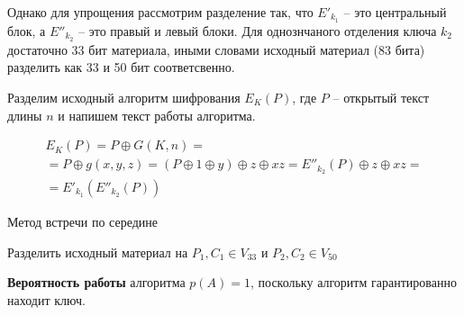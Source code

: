 \documentclass[a4paper,12pt]{article}
\theoremstyle{definition}
\begin{document}
	Однако для упрощения рассмотрим разделение так, что $E'_{k_1}$ -- это центральный блок, а $E''_{k_2}$ -- это правый и левый блоки. Для однознчаного отделения ключа $k_2$ достаточно $33$ бит материала, иными словами исходный материал (83 бита) разделить как 33 и 50 бит соответсвенно.
	
	Разделим исходный алгоритм шифрования $E_K(P)$, где $P$ -- открытый текст длины $n$ и напишем текст работы алгоритма.

	\begin{multline*}	
	E_K(P) = P \oplus G(K, n) = \\ = P \oplus g(x,y,z) = (P \oplus 1 \oplus y) \oplus z \oplus x z = E''_{k_2}(P) \oplus z \oplus x z = \\ = E'_{k_1}(E''_{k_2}(P))
	\end{multline*}
	
	\begin{algorithm}[H]
		
		\caption{Метод встречи по середине}
		\label{alg:Midle}
		\SetAlgoNoEnd
		
		
		Разделить исходный материал на $P_1, C_1 \in V_{33}$ и $P_2, C_2 \in V_{50}$
		

	
	\end{algorithm}	
	
	
	\textbf{Вероятность работы} алгоритма $p(A)=1$, поскольку алгоритм гарантированно находит ключ. 
	
\end{document}
